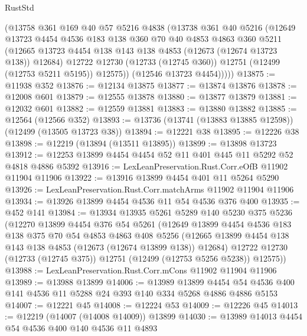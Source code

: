 \begin{lexlean}{RustStd}
\begin{coremodule}
{\begin{coremodule}
{{{{{{{{{{{{{{{{{{{{{{{{{{{{{{{{{{{{{{{{{{{{{{{{{{{{{{{{{{{{{{{{{{{{{{{{{{{{{{{{          (@13758
            @361
            @169
            @40
            @57
            @5216
            @4838
            (@13738
              @361
              @40
              @5216
              (@12649
                @13723
                @4454
                @4536
                @183
                @138
                @360
                @70
                @40
                @4853
                @4863
                @360
                @5211
                (@12665 @13723 @4454 @138 @143 @138 @4853 (@12673 (@12674 @13723 @138)) @12684)
                @12722
                @12730
                (@12733 (@12745 @360))
                @12751
                (@12499 (@12753 @5211 @5195))
                @12575))
            (@12546 @13723 @4454)))))
@13875 := @11938 @352
@13876 := @12134 @13875
@13877 := @13874 @13876
@13878 := @12008 @601
@13879 := @12555 @13878
@13880 := @13877 @13879
@13881 := @12032 @601
@13882 := @12559 @13881
@13883 := @13880 @13882
@13885 := @12564 (@12566 @352)
@13893 := @13736 (@13741 (@13883 @13885 @12598)) (@12499 (@13505 @13723 @38))
@13894 := @12221 @38
@13895 := @12226 @38
@13898 := @12219 (@13894 (@13511 @13895))
@13899 := @13898 @13723
@13912 := @12253 @13899 @4454 @4454 @52 @11 @401 @445 @11 @5292 @52 @4818 @4886 @5392
@13916 := LexLeanPreservation.Rust.Corr.eOfB @11902 @11904 @11906
@13922 := @13916 @13899 @4454 @401 @11 @5264 @5290
@13926 := LexLeanPreservation.Rust.Corr.matchArms @11902 @11904 @11906
@13934 := @13926 @13899 @4454 @4536 @11 @54 @4536 @376 @400
@13935 := @452 @141
@13984 := @13934
    @13935
    @5261
    @5289
    @140
    @5230
    @375
    @5236
    (@12270
      @13899
      @4454
      @376
      @54
      @5261
      (@12649
        @13899
        @4454
        @4536
        @183
        @138
        @375
        @70
        @54
        @4853
        @4863
        @408
        @5256
        (@12665 @13899 @4454 @138 @143 @138 @4853 (@12673 (@12674 @13899 @138)) @12684)
        @12722
        @12730
        (@12733 (@12745 @375))
        @12751
        (@12499 (@12753 @5256 @5238))
        @12575))
@13988 := LexLeanPreservation.Rust.Corr.mCons @11902 @11904 @11906
@13989 := @13988 @13899
@14006 := @13989
    @13899
    @4454
    @54
    @4536
    @400
    @141
    @4536
    @11
    @5288
    @24
    @393
    @140
    @334
    @5268
    @4886
    @4886
    @5153
@14007 := @12221 @45
@14008 := @12224 @53
@14009 := @12226 @45
@14013 := @12219 (@14007 (@14008 @14009)) @13899
@14030 := @13989
    @14013
    @4454
    @54
    @4536
    @400
    @140
    @4536
    @11
    @4893
}}}}}}}}}}}}}}}}}}}}}}}}}}}}}}}}}}}}}}}}}}}}}}}}}}}}}}}}}}}}}}}}}}}}}}}}}}}}}}}}
\end{coremodule}}
\end{coremodule}
\end{lexlean}
